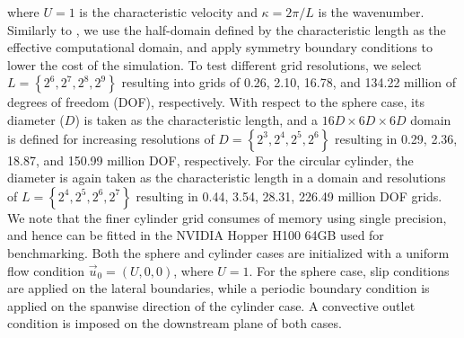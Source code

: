 \documentclass[10pt,a4paper]{article}
\begin{document}
where $U=1$ is the characteristic velocity and $\kappa=2\pi/L$ is the wavenumber. Similarly to \cite{Dairay2017}, we use the half-domain defined by the characteristic length as the effective computational domain, and apply symmetry boundary conditions to lower the cost of the simulation. To test different grid resolutions, we select $L=\left\{2^6,2^7,2^8,2^9\right\}$ resulting into grids of 0.26, 2.10, 16.78, and 134.22 million of degrees of freedom (DOF), respectively. With respect to the sphere case, its diameter ($D$) is taken as the characteristic length, and a $16D\times6D\times6D$ domain is defined for increasing resolutions of $D=\left\{2^3,2^4,2^5,2^6\right\}$ resulting in 0.29, 2.36, 18.87, and 150.99 million DOF, respectively. For the circular cylinder, the diameter is again taken as the characteristic length in a  domain and resolutions of $L=\left\{2^4,2^5,2^6,2^7\right\}$ resulting in 0.44, 3.54, 28.31, 226.49 million DOF grids. We note that the finer cylinder grid consumes  of memory using single precision, and hence can be fitted in the NVIDIA Hopper H100 64GB used for benchmarking. Both the sphere and cylinder cases are initialized with a uniform flow condition $\vec{u}_0=(U,0,0)$, where $U=1$. For the sphere case, slip conditions are applied on the lateral boundaries, while a periodic boundary condition is applied on the spanwise direction of the cylinder case. A convective outlet condition is imposed on the downstream plane of both cases. 
\end{document}
